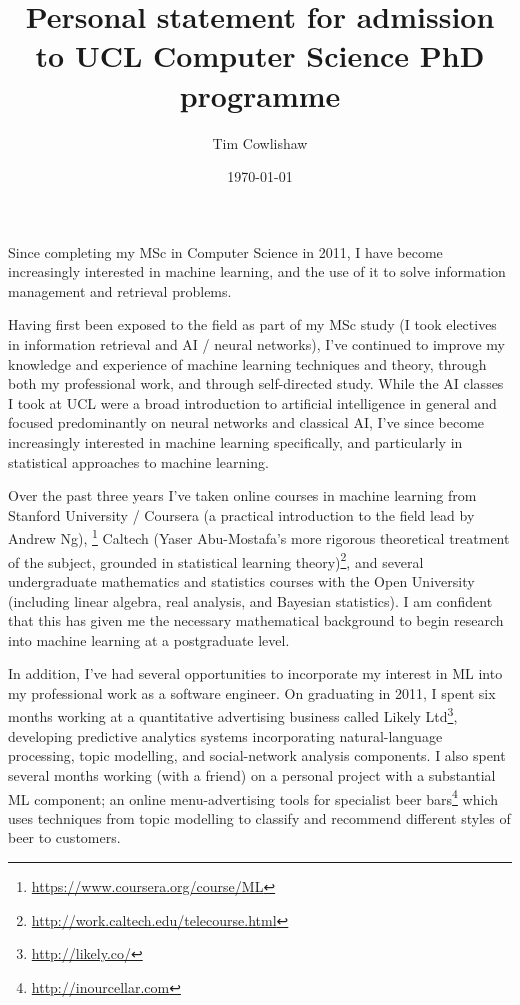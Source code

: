 \documentclass[a4paper, 11pt]{article}
\title{Personal statement for admission to UCL Computer Science PhD programme}
\author{Tim Cowlishaw}
\date{\today}
\begin{document}
\maketitle
Since completing my MSc in Computer Science in 2011, I have become increasingly interested in machine learning, and the use of it to solve information management and retrieval problems.

Having first been exposed to the field as part of my MSc study (I took electives in information retrieval and AI / neural networks), I've continued to improve my knowledge and experience of machine learning techniques and theory, through both my professional work, and through self-directed study. While the AI classes I took at UCL were a broad introduction to artificial intelligence in general and focused predominantly on neural networks and classical AI, I've since become increasingly interested in machine learning specifically, and particularly in statistical approaches to machine learning.

Over the past three years I've taken online courses in machine learning from Stanford University / Coursera (a practical introduction to the field lead by Andrew Ng), \footnote{\url{https://www.coursera.org/course/ML}} Caltech (Yaser Abu-Mostafa's more rigorous theoretical treatment of the subject, grounded in statistical learning theory)\footnote{\url{http://work.caltech.edu/telecourse.html}}, and several undergraduate mathematics and statistics courses with the Open University (including linear algebra, real analysis, and Bayesian statistics). I am confident that this has given me the necessary mathematical background to begin research into machine learning at a postgraduate level.

In addition, I've had several opportunities to incorporate my interest in ML into my professional work as a software engineer. On graduating in 2011, I spent six months working at a quantitative advertising business called Likely Ltd\footnote{\url{http://likely.co/}}, developing predictive analytics systems incorporating natural-language processing, topic modelling, and social-network analysis components. I also spent several months working (with a friend) on a personal project with a substantial ML component; an online menu-advertising tools for specialist beer bars\footnote{\url{http://inourcellar.com}} which uses techniques from topic modelling to classify and recommend different styles of beer to customers.
\end{document}

